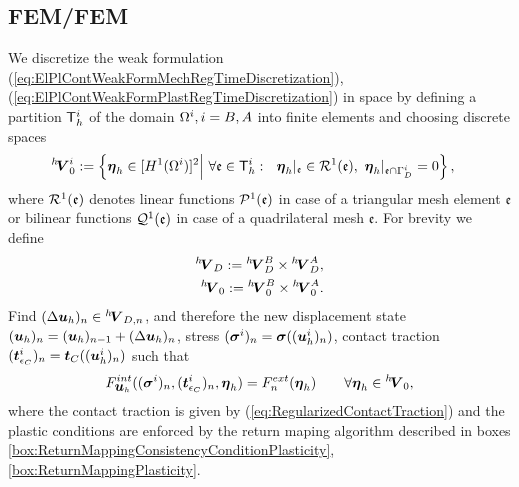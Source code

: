 \documentclass[12pt,a4paper]{scrbook}
\begin{document}
\subsection{FEM/FEM} \label{sec:FEMFEM}
We discretize the weak formulation (\ref{eq:ElPlContWeakFormMechRegTimeDiscretization}),(\ref{eq:ElPlContWeakFormPlastRegTimeDiscretization}) in space by defining a partition ${\mathsf T}^i_h$ of the domain $\Omega^i, i=B,A$ into finite elements and choosing  discrete spaces 
\begin{align*}
{}^h\!\mbox{\boldmath$V$}^i_{0} &:= \left\lbrace \mbox{\boldmath$\eta$}_h \in [H^1(\Omega^i)]^2 \middle|~\forall \mathfrak{e}\in{\mathsf T}^i_h:~~ \mbox{\boldmath$\eta$}_h|_{\mathfrak{e}} \in {\cal R}^1(\mathfrak{e}),~ \mbox{\boldmath$\eta$}_h|_{\mathfrak{e} \cap \Gamma_D^i} =  0 \right\rbrace,
\end{align*}
where ${\cal R}^1(\mathfrak{e})$ denotes linear functions ${\cal P}^1(\mathfrak{e})$ in case of  a triangular mesh element $\mathfrak{e}$ or bilinear functions ${\cal Q}^1(\mathfrak{e})$ in case of a quadrilateral mesh $\mathfrak{e}$. For brevity we define
\begin{align*}
{}^h\!\mbox{\boldmath$V$}_{D} := {}^h\!\mbox{\boldmath$V$}^{B}_{D} \times {}^h\!\mbox{\boldmath$V$}^{A}_{D}, \\
{}^h\!\mbox{\boldmath$V$}_{0} := {}^h\!\mbox{\boldmath$V$}^{B}_{0} \times {}^h\!\mbox{\boldmath$V$}^{A}_{0}.
\end{align*}
Find $(\Delta \mbox{\boldmath$u$}_h)_{n} \in {}^h\!\mbox{\boldmath$V$}_{D,n}$, and therefore the new displacement state $(\mbox{\boldmath$u$}_h)_{n}=(\mbox{\boldmath$u$}_h)_{n-1} + (\Delta \mbox{\boldmath$u$}_{h})_{n}$, stress $(\mbox{\boldmath$\sigma$}^i)_{n}=\mbox{\boldmath$\sigma$}((\mbox{\boldmath$u$}_{h}^i)_n)$, contact traction $(\mbox{\boldmath$t$}_{\epsilon_C}^i)_{n} = \mbox{\boldmath$t$}_C((\mbox{\boldmath$u$}_{h}^i)_n)$ such that
\begin{equation} \label{WeakFormF_n}
F^{int}_{\mbox{\boldmath$u$}_h}((\mbox{\boldmath$\sigma$}^i)_{n},(\mbox{\boldmath$t$}_{\epsilon_C}^i)_{n},\mbox{\boldmath$\eta$}_h) = F^{ext}_{n}(\mbox{\boldmath$\eta$}_h) \qquad \forall \mbox{\boldmath$\eta$}_h \in {}^h\!\mbox{\boldmath$V$}_0,
\end{equation}
where the contact traction is given by (\ref{eq:RegularizedContactTraction}) and the plastic conditions are enforced by the return maping algorithm described in boxes \ref{box:ReturnMappingConsistencyConditionPlasticity}, \ref{box:ReturnMappingPlasticity}.
\end{document}
